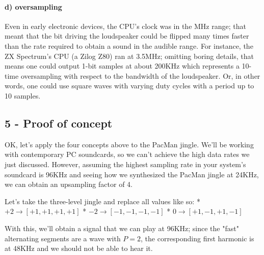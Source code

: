 \documentclass[11pt]{article}
\begin{document}
\paragraph{d) oversampling}\label{d-oversampling}

Even in early electronic devices, the CPU's clock was in the MHz range;
that meant that the bit driving the loudspeaker could be flipped many
times faster than the rate required to obtain a sound in the audible
range. For instance, the ZX Spectrum's CPU (a Zilog Z80) ran at 3.5MHz;
omitting boring details, that means one could output 1-bit samples at
about 200KHz which represents a 10-time oversampling with respect to the
bandwidth of the loudspeaker. Or, in other words, one could use square
waves with varying duty cycles with a period up to 10 samples.

    \subsection{5 - Proof of concept}\label{proof-of-concept}

OK, let's apply the four concepts above to the PacMan jingle. We'll be
working with contemporary PC soundcards, so we can't achieve the high
data rates we just discussed. However, assuming the highest sampling
rate in your system's soundcard is 96KHz and seeing how we synthesized
the PacMan jingle at 24KHz, we can obtain an upsampling factor of 4.

Let's take the three-level jingle and replace all values like so: *
\(+2 \rightarrow [+1, +1, +1, +1]\) *
\(-2 \rightarrow [-1, -1, -1, -1]\) * \(0 \rightarrow [+1, -1, +1, -1]\)

With this, we'll obtain a signal that we can play at 96KHz; since the
"fast" alternating segments are a wave with \(P=2\), the corresponding
first harmonic is at 48KHz and we should not be able to hear it.
\end{document}
